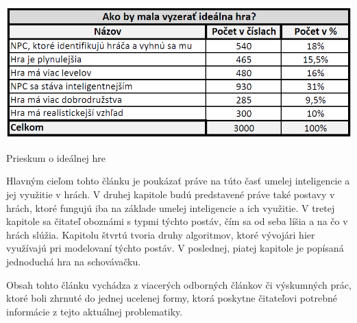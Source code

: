 \documentclass[10pt,twoside,slovak,a4paper]{article}
\begin{document}
\begin{table}[tbh]
\center \includegraphics[scale=0.5]{prieskum.png}
\caption{Prieskum o ideálnej hre}
\label{t:t1}
\end{table}

Hlavným cieľom tohto článku je poukázať práve na túto časť umelej inteligencie a jej využitie v hrách. V druhej kapitole budú predstavené práve také postavy v hrách, ktoré fungujú iba na základe umelej inteligencie a ich využitie. V tretej kapitole sa čitateľ oboznámi s typmi týchto postáv, čím sa od seba líšia a na čo v hrách slúžia. Kapitolu štvrtú tvoria druhy algoritmov, ktoré vývojári hier využívajú pri modelovaní týchto postáv. V poslednej, piatej kapitole je popísaná jednoduchá hra na schovávačku.

Obsah tohto článku vychádza z viacerých odborných článkov či výskumných prác, ktoré boli zhrnuté do jednej ucelenej formy, ktorá poskytne čitateľovi potrebné informácie z tejto aktuálnej problematiky. 
\end{document}
